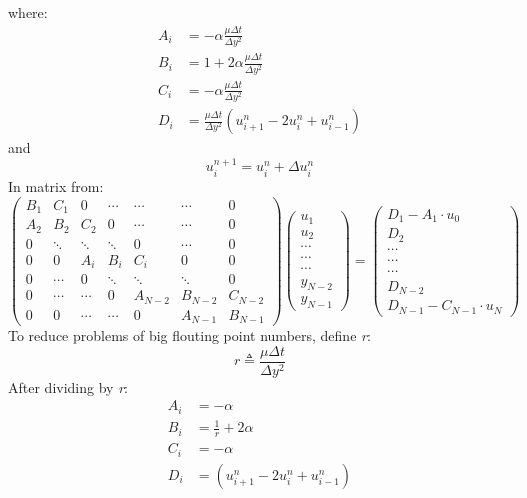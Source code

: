 \documentclass[11pt, a4paper]{article}
\begin{document}
where:
\begin{align}
    A_i &= - \alpha\frac{\mu\Delta t}{\Delta y^2}\\
    B_i &= 1 + 2 \alpha\frac{\mu\Delta t}{\Delta y^2}\\
    C_i &= - \alpha\frac{\mu\Delta t}{\Delta y^2}\\
    D_i &= \frac{\mu\Delta t}{\Delta y^2}\left(u^n_{i+1} - 2u^n_{i} + u^n_{i-1}\right)
\end{align}
and
\begin{equation}
    u^{n+1}_i = u^n_i + \Delta u^n_i
\end{equation}
In matrix from:
\begin{equation}
    \begin{pmatrix}
        B_1 & C_1 & 0 & \cdots & \cdots & \cdots & 0 \\
        A_2 & B_2 & C_2 & 0 & \cdots & \cdots & 0 \\
        0 & \ddots & \ddots & \ddots & 0 & \cdots & 0 \\
        0 & 0 & A_i & B_i & C_i & 0 & 0 \\
        0 & \cdots & 0 & \ddots & \ddots & \ddots & 0 \\
        0 & \cdots & \cdots & 0 & A_{N-2} & B_{N-2} & C_{N-2} \\
        0 & 0 & \cdots & \cdots & 0 & A_{N-1} &B_{N-1}
    \end{pmatrix}
    \begin{pmatrix}
        u_1\\
        u_2\\
        \cdots\\
        \cdots\\
        \cdots\\
        y_{N-2}\\
        y_{N-1}
    \end{pmatrix}
    =
    \begin{pmatrix}
        D_1-A_1\cdot u_0\\
        D_2\\
        \cdots\\
        \cdots\\
        \cdots\\
        D_{N-2}\\
        D_{N-1}-C_{N-1}\cdot u_N
    \end{pmatrix}
\end{equation}
To reduce problems of big flouting point numbers, define \emph{r}:
\begin{equation}
    r \triangleq \frac{\mu\Delta t}{\Delta y^2}
\end{equation}
After dividing by \emph{r}:
\begin{align}
    A_i &= - \alpha\\
    B_i &= \frac{1}{r} + 2 \alpha\\
    C_i &= - \alpha\\
    D_i &= \left(u^n_{i+1} - 2u^n_{i} + u^n_{i-1}\right)
\end{align}
\end{document}
